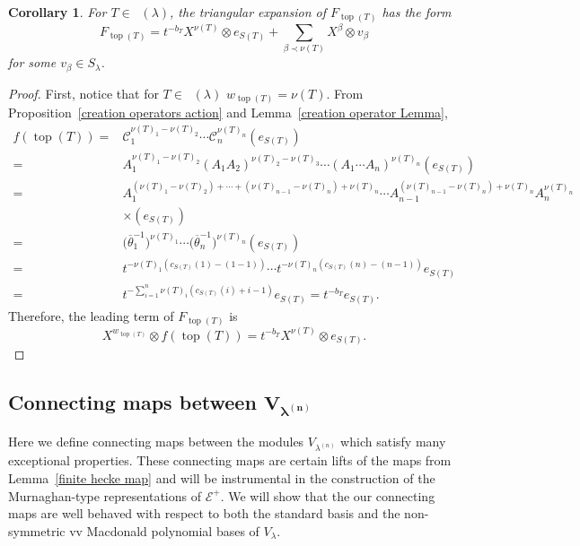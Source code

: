 \documentclass[10pt,a4paper]{amsart}
\numberwithin{equation}{section}
\newtheorem{Corollary}[Theorem]{Corollary}
\theoremstyle{definition}
\DeclareMathOperator{\RYT}{\mathrm{RYT}_{\geq 0}}
\DeclareMathOperator{\Top}{\mathrm{top}}
\begin{document}
\begin{Corollary}\label{triangular expansion of top element}
 For $T \in \RYT(\lambda)$, the triangular expansion of $F_{\Top(T)}$ has the form
 \[
 F_{\Top(T)}= t^{-b_T}X^{\nu(T)}\otimes e_{S(T)} + \sum_{\beta \prec \nu(T)} X^{\beta} \otimes v_{\beta}
 \]
 for some $v_{\beta} \in S_\lambda$.
\end{Corollary}
\begin{proof}
 First, notice that for $T \in \RYT(\lambda)$
 $w_{\Top(T)} = \nu(T)$. From Proposition~\ref{creation operators action} and Lemma~\ref{creation operator Lemma},
 \begin{align*}
 f(\Top(T)) ={}& \mathscr{C}_1^{\nu(T)_1 - \nu(T)_2}\cdots \mathscr{C}_n^{\nu(T)_n}(e_{S(T)}) \\
 ={}& A_1^{\nu(T)_1 - \nu(T)_2}(A_1A_2)^{\nu(T)_2-\nu(T)_3}\cdots (A_1\cdots A_n)^{\nu(T)_n}(e_{S(T)}) \\
 ={}& A_1^{(\nu(T)_1 - \nu(T)_2)+\cdots +(\nu(T)_{n-1}-\nu(T)_{n}) + \nu(T)_{n}}\cdots A_{n-1}^{(\nu(T)_{n-1}-\nu(T)_{n}) + \nu(T)_{n}}A_n^{\nu(T)_n}\\
 &\times (e_{S(T)}) \\
 ={}& \bigl(\overline{\theta}_1^{-1}\bigr)^{\nu(T)_1 }\cdots \bigl(\overline{\theta}_n^{-1}\bigr)^{\nu(T)_n} (e_{S(T)}) \\
 ={}& t^{-\nu(T)_1(c_{S(T)}(1)-(1-1))}\cdots t^{-\nu(T)_n(c_{S(T)}(n)-(n-1))} e_{S(T)} \\
 ={}& t^{-\sum_{i=1}^{n} \nu(T)_i( c_{S(T)}(i) + i-1)}e_{S(T)}
 = t^{-b_T} e_{S(T)}.
 \end{align*}
 Therefore, the leading term of $F_{\Top(T)}$ is
 \[
 X^{w_{\Top(T)}} \otimes f(\Top(T)) =t^{-b_T} X^{\nu(T)} \otimes e_{S(T)}.\tag*{\qed}
 \]\renewcommand{\qed}{}
\end{proof}

\subsection[Connecting maps between V\_lambda\^{}(n)]{Connecting maps between $\boldsymbol{V_{\lambda^{(n)}}}$}

Here we define connecting maps between the modules $V_{\lambda^{(n)}}$ which satisfy many exceptional properties. These connecting maps are certain lifts of the maps  from Lemma~\ref{finite hecke map} and will be instrumental in the construction of the Murnaghan-type representations of $\mathcal{E}^{+}$. We will show that the our connecting maps are well behaved with respect to both the standard basis and the non-symmetric vv Macdonald polynomial bases of $V_{\lambda}$.
\end{document}
